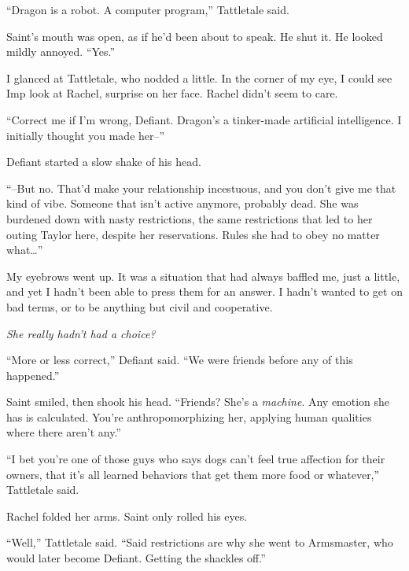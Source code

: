 ``Dragon is a robot.  A computer program,'' Tattletale said.



Saint's mouth was open, as if he'd been about to speak.  He shut it.  He looked mildly annoyed.  ``Yes.''



I glanced at Tattletale, who nodded a little.  In the corner of my eye, I could see Imp look at Rachel, surprise on her face.  Rachel didn't seem to care.



``Correct me if I'm wrong, Defiant.  Dragon's a tinker-made artificial intelligence.  I initially thought you made her--''



Defiant started a slow shake of his head.



``--But no.  That'd make your relationship incestuous, and you don't give me that kind of vibe.  Someone that isn't active anymore, probably dead.  She was burdened down with nasty restrictions, the same restrictions that led to her outing Taylor here, despite her reservations.  Rules she had to obey no matter what\ldots''



My eyebrows went up.  It was a situation that had always baffled me, just a little, and yet I hadn't been able to press them for an answer.  I hadn't wanted to get on bad terms, or to be anything but civil and cooperative.



\emph{She really hadn't had a choice?}



``More or less correct,'' Defiant said.  ``We were friends before any of this happened.''



Saint smiled, then shook his head.  ``Friends?  She's a \emph{machine}.  Any emotion she has is calculated.  You're anthropomorphizing her, applying human qualities where there aren't any.''



``I bet you're one of those guys who says dogs can't feel true affection for their owners, that it's all learned behaviors that get them more food or whatever,'' Tattletale said.



Rachel folded her arms.  Saint only rolled his eyes.



``Well,'' Tattletale said.  ``Said restrictions are why she went to Armsmaster, who would later become Defiant.  Getting the shackles off.''



